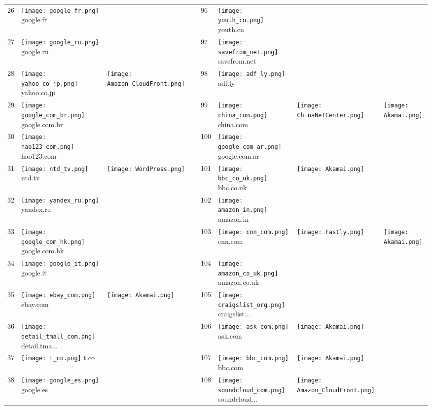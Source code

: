 \begin{table}[]
\begin{tabular}{|llll|llll|}
26 & \texttt{[image: google\_fr.png]} google.fr & & & 96 & \texttt{[image: youth\_cn.png]} youth.cn & & \\
27 & \texttt{[image: google\_ru.png]} google.ru & & & 97 & \texttt{[image: savefrom\_net.png]} savefrom.net & & \\
28 & \texttt{[image: yahoo\_co\_jp.png]} yahoo.co.jp & \texttt{[image: Amazon\_CloudFront.png]} & & 98 & \texttt{[image: adf\_ly.png]} adf.ly & & \\
29 & \texttt{[image: google\_com\_br.png]} google.com.br & & & 99 & \texttt{[image: china\_com.png]} china.com & \texttt{[image: ChinaNetCenter.png]} & \texttt{[image: Akamai.png]} \\
30 & \texttt{[image: hao123\_com.png]} hao123.com & & & 100 & \texttt{[image: google\_com\_ar.png]} google.com.ar & & \\
31 & \texttt{[image: ntd\_tv.png]} ntd.tv & \texttt{[image: WordPress.png]} & & 101 & \texttt{[image: bbc\_co\_uk.png]} bbc.co.uk & \texttt{[image: Akamai.png]} & \\
32 & \texttt{[image: yandex\_ru.png]} yandex.ru & & & 102 & \texttt{[image: amazon\_in.png]} amazon.in & & \\
33 & \texttt{[image: google\_com\_hk.png]} google.com.hk & & & 103 & \texttt{[image: cnn\_com.png]} cnn.com & \texttt{[image: Fastly.png]} & \texttt{[image: Akamai.png]} \\
34 & \texttt{[image: google\_it.png]} google.it & & & 104 & \texttt{[image: amazon\_co\_uk.png]} amazon.co.uk & & \\
35 & \texttt{[image: ebay\_com.png]} ebay.com & \texttt{[image: Akamai.png]} & & 105 & \texttt{[image: craigslist\_org.png]} craigslist... & & \\
36 & \texttt{[image: detail\_tmall\_com.png]} detail.tma... & & & 106 & \texttt{[image: ask\_com.png]} ask.com & \texttt{[image: Akamai.png]} & \\
37 & \texttt{[image: t\_co.png]} t.co & & & 107 & \texttt{[image: bbc\_com.png]} bbc.com & \texttt{[image: Akamai.png]} & \\
38 & \texttt{[image: google\_es.png]} google.es & & & 108 & \texttt{[image: soundcloud\_com.png]} soundcloud... & \texttt{[image: Amazon\_CloudFront.png]} & \\

\end{tabular}
\end{table}
